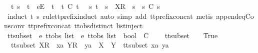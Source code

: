 \begin{isabellebody}
\ \ {\isacharparenleft}{\isasymexists}t{}{\isacharprime}{\isachardot}\ s{}\ {\isacharequal}\ t{}\ {\isacharat}\ {\isacharbrackleft}e{\isacharbrackright}\isactrlsub E\ {\isacharhash}\ t{}{\isacharprime}\ {\isasymand}\ t{}{\isacharprime}\ {\isasymle}\isactrlsub C\ t{}{\isacharparenright}\ {\isasymor}\ {\isacharparenleft}{\isasymexists}\ s{}{\isacharprime}{\isachardot}\ t{}\ {\isacharequal}\ s{}\ {\isacharat}\ {\isacharbrackleft}X{\isacharbrackright}\isactrlsub R\ {\isacharhash}\ s{}{\isacharprime}\ {\isasymand}\ s{}{\isacharprime}\ {\isasymle}\isactrlsub C\ s{}{\isacharparenright}{\isachardoublequoteclose}\isanewline
%
\isadelimproof
\ \ %
\endisadelimproof
%
\isatagproof
{}\isamarkupfalse%
\ {\isacharparenleft}induct\ t{}\ s{}\ rule{\isacharcolon}tt{\isacharunderscore}prefix{\isachardot}induct{\isacharcomma}\ auto\ simp\ add{\isacharcolon}\ tt{\isacharunderscore}prefix{\isacharunderscore}concat{\isacharcomma}\ metis\ append{\isacharunderscore}eq{\isacharunderscore}Cons{\isacharunderscore}conv\ tt{\isacharunderscore}prefix{\isacharunderscore}concat\ ttobs{\isachardot}distinct{\isacharparenleft}{}{\isacharparenright}\ list{\isachardot}inject{\isacharparenright}%
\endisatagproof
{\isafoldproof}%
%
\isadelimproof
%
\endisadelimproof
%
\isadelimdocument
%
\endisadelimdocument
%
\isatagdocument
%
\isamarkuptrue%
%
\endisatagdocument
{\isafolddocument}%
%
\isadelimdocument
%
\endisadelimdocument
{}\isamarkupfalse%
\ tt{\isacharunderscore}subset\ {\isacharcolon}{\isacharcolon}\ {\isachardoublequoteopen}{\isacharprime}e\ ttobs\ list\ {\isasymRightarrow}\ {\isacharprime}e\ ttobs\ list\ {\isasymRightarrow}\ bool{\isachardoublequoteclose}\ {\isacharparenleft}\ {\isachardoublequoteopen}{\isasymsubseteq}\isactrlsub C{\isachardoublequoteclose}\ {}{}{\isacharparenright}\ \isanewline
\ \ {\isachardoublequoteopen}tt{\isacharunderscore}subset\ {\isacharbrackleft}{\isacharbrackright}\ {\isacharbrackleft}{\isacharbrackright}\ {\isacharequal}\ True{\isachardoublequoteclose}\ {\isacharbar}\isanewline
\ \ {\isachardoublequoteopen}tt{\isacharunderscore}subset\ {\isacharparenleft}{\isacharbrackleft}X{\isacharbrackright}\isactrlsub R\ {\isacharhash}\ xa{\isacharparenright}\ {\isacharparenleft}{\isacharbrackleft}Y{\isacharbrackright}\isactrlsub R\ {\isacharhash}\ ya{\isacharparenright}\ {\isacharequal}\ {\isacharparenleft}X\ {\isasymsubseteq}\ Y\ {\isasymand}\ tt{\isacharunderscore}subset\ xa\ ya{\isacharparenright}{\isachardoublequoteclose}\ {\isacharbar}\isanewline

\end{isabellebody}
